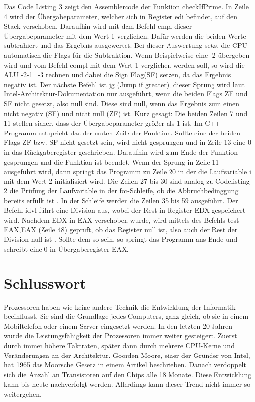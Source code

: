 \documentclass[a4paper,12pt]{article}
\begin{document}
\noindent Das Code Listing 3 zeigt den Assemblercode der Funktion checkIfPrime. In Zeile 4 wird der Übergabeparameter, welcher sich in Register edi befindet, auf den Stack verschoben. Daraufhin wird mit dem Befehl cmpl dieser Übergabeparameter mit dem Wert 1 verglichen. Dafür werden die beiden Werte subtrahiert und das Ergebnis ausgewertet. Bei dieser Auswertung setzt die CPU automatisch die Flags für die Subtraktion. Wenn Beispielweise eine -2 übergeben wird und vom Befehl compl mit dem Wert 1 verglichen werden soll, so wird die ALU -2-1=-3 rechnen und dabei die Sign Flag(SF) setzen, da das Ergebnis negativ ist. Der nächste Befehl ist jg (Jump if greater), dieser Sprung wird laut Intel-Architektur-Dokumentation nur ausgeführt, wenn die beiden Flags ZF und SF nicht gesetzt, also null sind. Diese sind null, wenn das Ergebnis zum einen nicht negativ (SF) und nicht null (ZF) ist. \newline Kurz gesagt: Die beiden Zeilen 7 und 11 stellen sicher, dass der Übergabeparameter größer als 1 ist. Im C++ Programm entspricht das der ersten Zeile der Funktion. Sollte eine der beiden Flags ZF bzw. SF nicht gesetzt sein, wird nicht gesprungen und in Zeile 13 eine 0 in das Rückgaberegister geschrieben. Daraufhin wird zum Ende der Funktion gesprungen und die Funktion ist beendet. Wenn der Sprung in Zeile 11 ausgeführt wird, dann springt das Programm zu Zeile 20 in der die Laufvariable i  mit dem Wert 2 initialisiert wird. Die Zeilen 27 bis 30 sind analog zu Codelisting 2 die Prüfung der Laufvariable in der for-Schleife, ob die Abbruchbedinggung bereits erfüllt ist \cite{c}. In der Schleife werden die Zeilen 35 bis 59 ausgeführt. Der Befehl idvl führt eine Division aus, wobei der Rest in Register EDX gespeichert wird. Nachdem EDX in EAX verschoben wurde, wird mittels des Befehls test EAX,EAX (Zeile 48) geprüft, ob das Register null ist, also auch der Rest der Division null ist \cite{elements2005}. Sollte dem so sein, so springt das Programm ans Ende und schreibt eine 0 in Übergaberegister EAX\cite[S.202]{technischeInformatik2}.
\newpage

\section{Schlusswort}
Prozessoren haben wie keine andere Technik die Entwicklung der Informatik beeinflusst. Sie sind die Grundlage jedes Computers, ganz gleich, ob sie in einem Mobiltelefon oder einem Server eingesetzt werden. In den letzten 20 Jahren wurde die Leistungsfähigkeit der Prozessoren immer weiter gesteigert. Zuerst durch immer höhere Taktraten, später dann durch mehrere CPU-Kerne und Veränderungen an der Architektur. Goorden Moore, einer der Gründer von Intel, hat 1965 das Moorsche Gesetz in einem Artikel beschrieben. Danach verdoppelt sich die Anzahl an Transistoren auf den Chips alle 18 Monate. Diese Entwicklung kann bis heute nachverfolgt werden. Allerdings kann dieser Trend nicht immer so weitergehen. 
\end{document}
